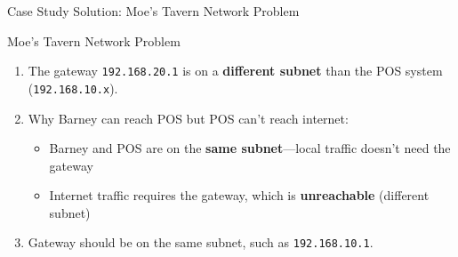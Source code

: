 \documentclass[aspectratio=169]{beamer}  %
\begin{document}
\begin{frame}{Case Study Solution: Moe's Tavern Network Problem}
    \begin{casesolution}{Moe's Tavern Network Problem}
        \begin{enumerate}
            \item The gateway \texttt{192.168.20.1} is on a \textbf{different subnet} than the POS system (\texttt{192.168.10.x}).
            \item Why Barney can reach POS but POS can't reach internet:
                \begin{itemize}
                    \item Barney and POS are on the \textbf{same subnet}---local traffic doesn't need the gateway
                    \item Internet traffic requires the gateway, which is \textbf{unreachable} (different subnet)
                \end{itemize}
            \item Gateway should be on the same subnet, such as \texttt{192.168.10.1}.
        \end{enumerate}
    \end{casesolution}
    
    \vspace{0.3em}
    \begin{center}
\end{center}
\end{frame}
\end{document}
